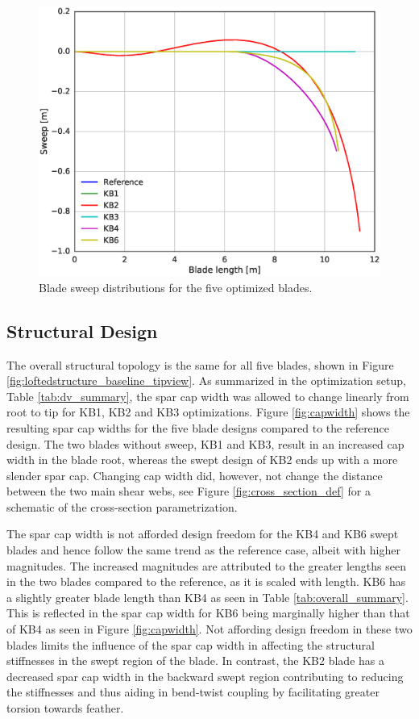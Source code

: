 \begin{figure}[pht]
\begin{center}
	\includegraphics[width=.85\linewidth]{figures/KBcomp_sweep.eps}
\end{center}
\caption{Blade sweep distributions for the five optimized blades.}
\label{fig:sweep}
\end{figure}

\subsection{Structural Design}

The overall structural topology is the same for all five blades, shown in Figure \ref{fig:loftedstructure_baseline_tipview}.
As summarized in the optimization setup, Table \ref{tab:dv_summary}, the spar cap width was allowed to change linearly from root to tip for KB1, KB2 and KB3 optimizations. Figure \ref{fig:capwidth} shows the resulting spar cap widths for the five blade designs compared to the reference design.
The two blades without sweep, KB1 and KB3, result in an increased cap width in the blade root, whereas the swept design of KB2 ends up with a more slender spar cap. Changing cap width did, however, not change the distance between the two main shear webs, see Figure \ref{fig:cross_section_def} for a schematic of the cross-section parametrization.

The spar cap width is not afforded design freedom for the KB4 and KB6 swept blades and hence follow the same trend as the reference case, albeit with higher magnitudes. The increased magnitudes are attributed to the greater lengths seen in the two blades compared to the reference, as it is scaled with length. KB6 has a slightly greater blade length than KB4 as seen in Table \ref{tab:overall_summary}. This is reflected in the spar cap width for KB6 being marginally higher than that of KB4 as seen in Figure \ref{fig:capwidth}. Not affording design freedom in these two blades limits the influence of the spar cap width in affecting the structural stiffnesses in the swept region of the blade. In contrast, the KB2 blade has a decreased spar cap width in the backward swept region contributing to reducing the stiffnesses and thus aiding in bend-twist coupling by facilitating greater torsion towards feather. 

